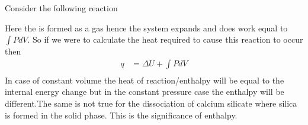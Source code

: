 \documentclass[12pt]{article}
\begin{document}
Consider the following reaction
\begin{center}
\end{center}
Here the  is formed as a gas hence the system expands and does work equal to $\int PdV$. So if we were to calculate the heat required to cause this reaction to occur then 
\begin{align*}
	q&=\Delta U+\int PdV\\
\end{align*}
In case of constant volume the heat of reaction/enthalpy will be equal to the internal energy change but in the constant pressure case the enthalpy will be different.The same is not true for the dissociation of calcium silicate where silica is formed in the solid phase. This is the significance of enthalpy.
\end{document}
